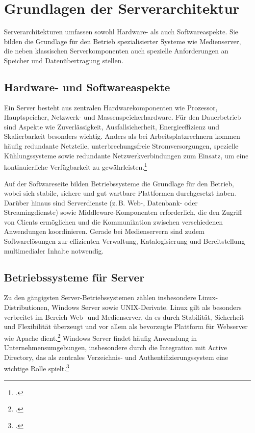 \documentclass[12pt,a4paper]{report}
\begin{document}
\section{Grundlagen der Serverarchitektur}
Serverarchitekturen umfassen sowohl Hardware- als auch Softwareaspekte. 
Sie bilden die Grundlage für den Betrieb spezialisierter Systeme wie Medienserver, 
die neben klassischen Serverkomponenten auch spezielle Anforderungen an Speicher und Datenübertragung stellen.

  \subsection{Hardware- und Softwareaspekte}
  Ein Server besteht aus zentralen Hardwarekomponenten wie Prozessor, Hauptspeicher, Netzwerk- und Massenspeicherhardware. 
  Für den Dauerbetrieb sind Aspekte wie Zuverlässigkeit, Ausfallsicherheit, Energieeffizienz und Skalierbarkeit besonders wichtig. 
  Anders als bei Arbeitsplatzrechnern kommen häufig redundante Netzteile, unterbrechungsfreie Stromversorgungen, 
  spezielle Kühlungssysteme sowie redundante Netzwerkverbindungen zum Einsatz, 
  um eine kontinuierliche Verfügbarkeit zu gewährleisten.\footcite[Vgl.][S.~152541]{ahmed2021energy} 

  Auf der Softwareseite bilden Betriebssysteme die Grundlage für den Betrieb, 
  wobei sich stabile, sichere und gut wartbare Plattformen durchgesetzt haben. 
  Darüber hinaus sind Serverdienste (z.\,B. Web-, Datenbank- oder Streamingdienste) 
  sowie Middleware-Komponenten erforderlich, die den Zugriff von Clients ermöglichen 
  und die Kommunikation zwischen verschiedenen Anwendungen koordinieren. 
  Gerade bei Medienservern sind zudem Softwarelösungen zur effizienten Verwaltung, 
  Katalogisierung und Bereitstellung multimedialer Inhalte notwendig.

  \subsection{Betriebssysteme für Server}
  Zu den gängigsten Server-Betriebssystemen zählen insbesondere 
  Linux-Dis\-tributionen, Windows Server sowie \ac{UNIX}-Derivate.
  Linux gilt als besonders verbreitet im Bereich Web- und Medienserver, 
  da es durch Stabilität, Sicherheit und Flexibilität überzeugt und 
  vor allem als bevorzugte Plattform für Webserver wie Apache dient.\footcite[Vgl.][S.~963~ff.]{nemeth_unixlinux} 
  Windows Server findet häufig Anwendung in Unternehmensumgebungen, 
  insbesondere durch die Integration mit Active Directory, 
  das als zentrales Verzeichnis- und Authentifizierungssystem eine 
  wichtige Rolle spielt.\footcite[Vgl.][S.~1154~f.]{nemeth_unixlinux}
\end{document}
